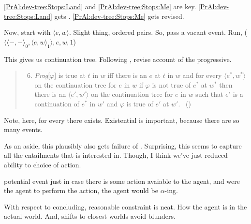 \begin{note}
  \autoref{PrAl:dev-tree:Stops:Land} and \autoref{PrAl:dev-tree:Stops:Me} are key.
  \autoref{PrAl:dev-tree:Stops:Land} gets \citeauthor{Landman:1992wh}.
  \autoref{PrAl:dev-tree:Stops:Me} gets revised.

  Now, start with \(\langle e,w \rangle\).
  Slight thing, ordered pairs.
  So, pass a vacant event.
  Run, \AlgDevelopTree{}(\(\langle \langle -,- \rangle_{0}, \langle e,w \rangle_{1} \rangle, e, w, 1\))
\end{note}

\begin{note}
  This gives us continuation tree.
  Following \citeauthor{Szabo:2004ul}, revise account of the progressive.

  \begin{quote}
    \begin{enumerate}[label=(\Roman*), ref=(\Roman*)]
      \setcounter{enumi}{5}
    \item
      \emph{Prog}[\(\varphi\)] is true at \(t\) in \(w\) iff there is an \(e\) at \(t\) in \(w\) and for every \(\langle e^{\ast}, w^{\ast} \rangle\) on the continuation tree for \(e\) in \(w\) if \(\varphi\) is not true of \(e^{\ast}\) at \(w^{\ast}\) then there is an \(\langle e', w' \rangle\) on the continuation tree for \(e\) in \(w\) such that \(e'\) is a continuation of \(e^{\ast}\) in \(w'\) and \(\varphi\) is true of \(e'\) at \(w'\).%
      \mbox{ }\hfill\mbox{(\citeyear[37]{Szabo:2004ul})}
    \end{enumerate}
  \end{quote}

  Note, here, for every there exists.
  Existential is important, because there are so many events.

  As an aside, this plausibly also gets failure of \BoyVS{}.
  Surprising, this seems to capture all the entailments that \citeauthor{Boylan:2020aa} is interested in.
  Though, I think we've just reduced ability to choice of action.
\end{note}

\begin{note}
  potential event just in case there is some action avaiable to the agent, and were the agent to perform the action, the agent would be \(\alpha\)-ing.
\end{note}

\begin{note}
  With respect to concluding, reasonable constraint is neat.
  How the agent is in the actual world.
  And, shifts to closest worlds avoid blunders.
\end{note}

